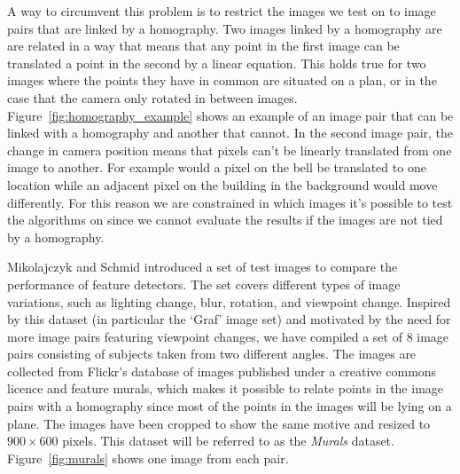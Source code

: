 A way to circumvent this problem is to restrict the images we test on to 
image pairs that are linked by a homography. Two images linked by a 
homography are are related in a way that means that any point in the 
first image can be translated a point in the second by a linear 
equation. This holds true for two images where the points they have in 
common are situated on a plan, or in the case that the camera only 
rotated in between images. Figure~\ref{fig:homography_example} shows an 
example of an image pair that can be linked with a homography and 
another that cannot. In the second image pair, the change in camera 
position means that pixels can't be linearly translated from one image 
to another. For example would a pixel on the bell be translated to one 
location while an adjacent pixel on the building in the background would
move differently. For this reason we are constrained in which images 
it's possible to test the algorithms on since we cannot evaluate the 
results if the images are not tied by a homography.

Mikolajczyk and Schmid  \cite{mikolajczyk2005performance} introduced a 
set of test images to compare the performance of feature detectors. The 
set covers different types of image variations, such as lighting change, 
blur, rotation, and viewpoint change. Inspired by this dataset (in 
particular the `Graf' image set) and motivated by the need for more 
image pairs featuring viewpoint changes, we have compiled a set of 8 
image pairs consisting of subjects taken from two different angles. The 
images are collected from Flickr's database of images published under a 
creative commons licence and feature murals, which makes it possible to 
relate points in the image pairs with a homography since most of the 
points in the images will be lying on a plane.  The images have been 
cropped to show the same motive and resized to $900\times 600$ pixels.  
This dataset will be referred to as the \emph{Murals} dataset.  
Figure~\ref{fig:murals} shows one image from each pair.

